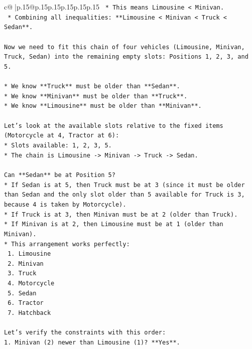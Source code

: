 \documentclass{article}
\begin{document}
{\begin{supertabular}{c@{$\;$}|p{.15\linewidth}@{}p{.15\linewidth}p{.15\linewidth}p{.15\linewidth}p{.15\linewidth}p{.15\linewidth}}
{{{\texttt{    *   This means Limousine < Minivan.} \\
\texttt{    *   Combining all inequalities: **Limousine < Minivan < Truck < Sedan**.} \\
\\ 
\texttt{Now we need to fit this chain of four vehicles (Limousine, Minivan, Truck, Sedan) into the remaining empty slots: Positions 1, 2, 3, and 5.} \\
\\ 
\texttt{*   We know **Truck** must be older than **Sedan**.} \\
\texttt{*   We know **Minivan** must be older than **Truck**.} \\
\texttt{*   We know **Limousine** must be older than **Minivan**.} \\
\\ 
\texttt{Let's look at the available slots relative to the fixed items (Motorcycle at 4, Tractor at 6):} \\
\texttt{*   Slots available: 1, 2, 3, 5.} \\
\texttt{*   The chain is Limousine {-}> Minivan {-}> Truck {-}> Sedan.} \\
\\ 
\texttt{Can **Sedan** be at Position 5?} \\
\texttt{*   If Sedan is at 5, then Truck must be at 3 (since it must be older than Sedan and the only slot older than 5 available for Truck is 3, because 4 is taken by Motorcycle).} \\
\texttt{*   If Truck is at 3, then Minivan must be at 2 (older than Truck).} \\
\texttt{*   If Minivan is at 2, then Limousine must be at 1 (older than Minivan).} \\
\texttt{*   This arrangement works perfectly:} \\
\texttt{    1.  Limousine} \\
\texttt{    2.  Minivan} \\
\texttt{    3.  Truck} \\
\texttt{    4.  Motorcycle} \\
\texttt{    5.  Sedan} \\
\texttt{    6.  Tractor} \\
\texttt{    7.  Hatchback} \\
\\ 
\texttt{Let's verify the constraints with this order:} \\
\texttt{1.  Minivan (2) newer than Limousine (1)? **Yes**.} \\
}}}
\end{supertabular}}
\end{document}
